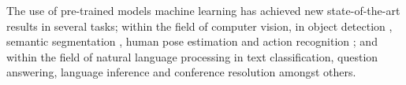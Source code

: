 The use of pre-trained models machine learning has achieved new state-of-the-art results in several tasks; within the field of computer vision, in object detection \citet{he2017}, semantic segmentation \citet{zhao2016}, human pose estimation \citet{papandreou2017} and action recognition \citet{carreira2017} ; and within the field of natural language processing in text classification, question answering, language inference and conference resolution amongst others. \citet{howard2018} \citet{joshi2018}


